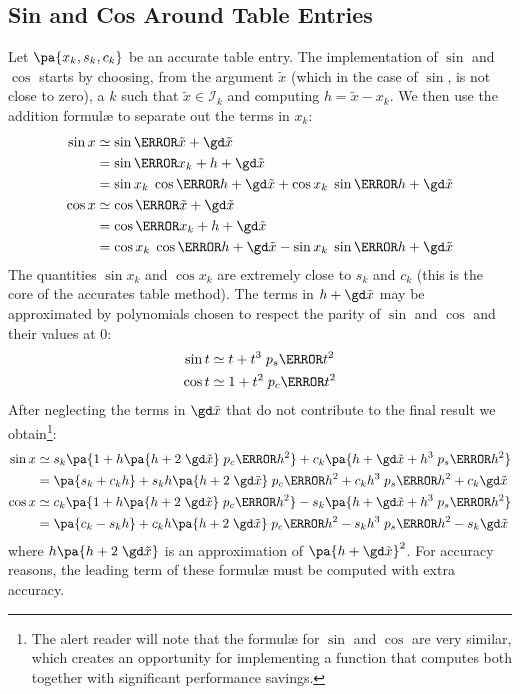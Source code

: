 \documentclass[10pt, a4paper, twoside]{basestyle}
\newcommand{\red}[1]{\tilde{#1}}
\begin{document}
\subsection*{Sin and Cos Around Table Entries}

Let $\pa{x_k, s_k, c_k}$ be an accurate table entry.  The implementation of $\sin$ and $\cos$ starts by choosing, from the argument $\red x$ (which in the case of $\sin$, is not close to zero), a $k$ such that $\red x \in \mathscr{I}_k$ and computing $h = \red x - x_k$.  We then use the addition formulæ to separate out the terms in $x_k$:
\begin{align*}
\sin x &\simeq \sin\of{\red x + \gd \red x} \\
&= \sin\of{x_k + h + \gd \red x} \\
&= \sin x_k \; \cos\of{h + \gd \red x} + \cos x_k \; \sin\of{h + \gd \red x} \\
\cos x &\simeq \cos\of{\red x + \gd \red x}  \\
&= \cos\of{x_k + h + \gd \red x} \\
&= \cos x_k \; \cos\of{h + \gd \red x} - \sin x_k \; \sin\of{h + \gd \red x}
\end{align*}
The quantities $\sin x_k$ and $\cos x_k$ are extremely close to $s_k$ and $c_k$ (this is the core of the accurates table method).  The terms in $h + \gd \red x$ may be approximated by polynomials chosen to respect the parity of $\sin$ and $\cos$ and their values at $0$:
\begin{align*}
\sin t &\simeq t + t^3 \; p_s\of{t^2} \\
\cos t &\simeq 1 + t^2 \; p_c\of{t^2}
\end{align*}
After neglecting the terms in $\gd \red x$ that do not contribute to the final result we obtain\footnote{The alert reader will note that the formulæ for $\sin$ and $\cos$ are very similar, which creates an opportunity for implementing a function that computes both together with significant performance savings.}:
\begin{align*}
\sin x &\simeq s_k \pa{1 + h \pa{h + 2 \; \gd \red x} \; p_c\of{h^2}} + c_k \pa{h + \gd \red x + h^3 \; p_s\of{h^2}} \\
&= \pa{s_k + c_k h} + s_k h \pa{h + 2 \; \gd \red x} \; p_c\of{h^2} + c_k h^3 \; p_s\of{h^2} + c_k \gd \red x \\
\cos x &\simeq c_k \pa{1 + h \pa{h + 2 \; \gd \red x} \; p_c\of{h^2}} - s_k \pa{h + \gd \red x + h^3 \; p_s\of{h^2}} \\
&= \pa{c_k - s_k h} + c_k h \pa{h + 2 \; \gd \red x} \; p_c\of{h^2} - s_k h^3 \; p_s\of{h^2} - s_k \gd \red x
\end{align*}
where $h \pa{h + 2 \; \gd \red x}$ is an approximation of $\pa{h + \gd \red x}^2$.  For accuracy reasons, the leading term of these formulæ must be computed with extra accuracy.
\end{document}
